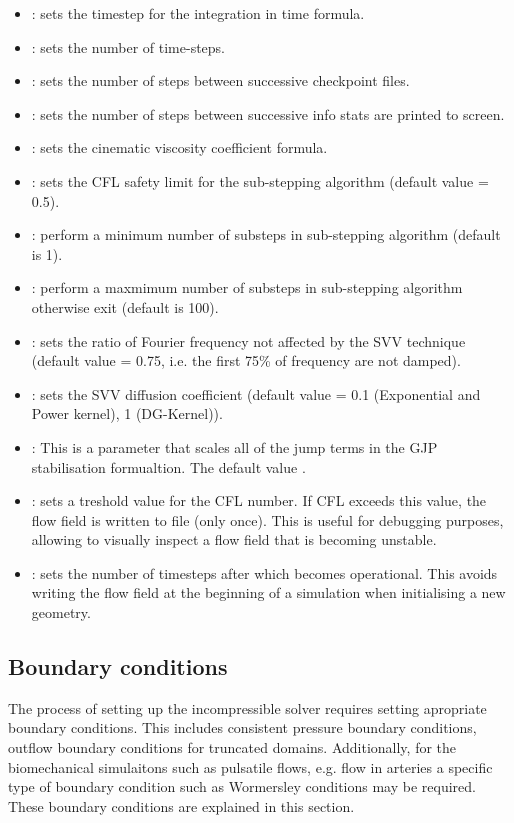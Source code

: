 \begin{itemize}
\item {}: sets the timestep for the integration in time formula.
\item {}: sets the number of time-steps.
\item {}: sets the number of steps between successive checkpoint files.
\item {}: sets the number of steps between successive info stats are printed to screen.
\item {}: sets the cinematic viscosity coefficient formula.
\item {}: sets the CFL safety limit for the sub-stepping algorithm (default value = 0.5).
\item {}: perform a minimum number of substeps in sub-stepping algorithm (default is 1).
\item {}: perform a maxmimum  number of substeps in sub-stepping algorithm otherwise exit (default is 100).
\item {}: sets the ratio of Fourier frequency not affected by the SVV technique (default value = 0.75, i.e. the first 75\% of frequency are not damped).
\item {}: sets the SVV diffusion coefficient (default value = 0.1 (Exponential and Power kernel), 1 (DG-Kernel)).
\item {}: This is a parameter that scales all of the jump terms in the GJP stabilisation formualtion. The default value .
\item {}: sets a treshold value for the CFL number. If CFL exceeds this value, the flow field is written to file (only once). This is useful for debugging purposes, allowing to visually inspect a flow field that is becoming unstable.
\item {}: sets the number of timesteps after which  becomes operational. This avoids writing the flow field at the beginning of a simulation when initialising a new geometry.
\end{itemize}


\subsection{Boundary conditions}
The process of setting up the incompressible solver requires setting apropriate 
boundary conditions. This includes consistent pressure boundary conditions, 
outflow boundary conditions for truncated domains. Additionally, for the 
biomechanical simulaitons such as pulsatile flows, e.g. flow in arteries a
specific type of boundary condition such as Wormersley conditions may be required.
These boundary conditions are explained in this section.

